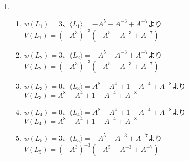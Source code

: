 \documentclass{jsarticle}
\begin{document}
\begin{enumerate}
\begin{proof}
以上の補題\ref{ringoku}を踏まえ、問題である$5$色定理を示す。

地図上の国の数$N$に関する帰納法により証明する。
\begin{enumerate}
\item $ N = 1 $のとき\\
任意の色で塗ればよく、自明である。
\item $ N = k $で5色定理が成り立つとする。\\
$ N(M) = k + 1 $である地図$M$を$5$色で塗ることを考える。
補題\ref{ringoku}により$M$には隣国が$5$個以下の国が存在するから、その国を$C(\in M)$とする。
$M$から$C$を除いた地図を$M'(\subsetneq M)$とすると、$ N(M') = k $だから、帰納法の仮定により$M'$は$5$色で塗り分けられる。
\begin{enumerate}
\item $C$が5個の隣国を持ち、全て異なる色で塗られているとき\\
$C$の隣国を時計回りに$C_1,\cdots,C_5$として、それぞれの色を$c_1,\cdots,c_5$とする。
$C_2$から$c_2$と$c_5$のみをたどって到達可能な国の集合を$S(\subsetneq M')$とし、
$C_1$から$c_1$と$c_3$のみをたどって到達可能な国の集合を$S'(\subsetneq M')$とする。
\begin{enumerate}
\item $C_5\notin S$のとき\\
$S$の$c_2$と$c_5$を反転させ、$C$を$c_2$で塗ればよい。
\item $C_5\in S$のとき\\
$S$により$C_1$と$C_3$は分断されているから$C_3\notin S'$である。
したがってA.と同様にして$S'$の$c_1$と$c_3$を反転させ、$C$を$c_1$で塗ればよい。
\end{enumerate}
\item そのほかの場合\\
$C$の隣国に使われていない色で$C$を塗ればよい。\\
\end{enumerate}
\end{enumerate}
(a),(b)より、数学的帰納法から任意の地図上で$5$色定理は肯定される。
\end{proof}

\item
\begin{enumerate}
\renewcommand{\labelenumii}{(\arabic{enumii})}
\item $ w(L_1) = 3 $、$ \langle L_1 \rangle = -A^5 - A^{-3} + A^{-7} $より$ V(L_1) = (-A^3)^{-3}(-A^5 - A^{-3} + A^{-7}) $
\item $ w(L_2) = 3 $、$ \langle L_2 \rangle = -A^5 - A^{-3} + A^{-7} $より$ V(L_2) = (-A^3)^{-3}(-A^5 - A^{-3} + A^{-7}) $
\item $ w(L_3) = 0 $、$ \langle L_3 \rangle = A^8 - A^4 + 1 - A^{-4} + A^{-8} $より$ V(L_3) = A^8 - A^4 + 1 - A^{-4} + A^{-8} $
\item $ w(L_4) = 0 $、$ \langle L_4 \rangle = A^8 - A^4 + 1 - A^{-4} + A^{-8} $より$ V(L_4) = A^8 - A^4 + 1 - A^{-4} + A^{-8} $
\item $ w(L_5) = 3 $、$ \langle L_5 \rangle = -A^5 - A^{-3} + A^{-7} $より$ V(L_5) = (-A^3)^{-3}(-A^5 - A^{-3} + A^{-7}) $

\end{enumerate}

\end{enumerate}
\end{document}
